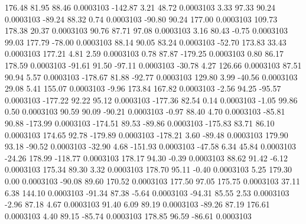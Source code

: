       176.48       81.95       88.46     0.0003103
     -142.87        3.21       48.72     0.0003103
        3.33       97.33       90.24     0.0003103
      -89.24       88.32        0.74     0.0003103
      -90.80       90.24      177.00     0.0003103
      109.73      178.38       20.37     0.0003103
       90.76       87.71       97.08     0.0003103
        3.16       80.43       -0.75     0.0003103
       99.03      177.79      -78.00     0.0003103
       88.14       90.05       83.24     0.0003103
      -52.70      173.83       33.43     0.0003103
      177.21        4.81        2.59     0.0003103
        0.78       87.87     -179.25     0.0003103
        0.80       86.17      178.59     0.0003103
      -91.61       91.50      -97.11     0.0003103
      -30.78        4.27      126.66     0.0003103
       87.51       90.94        5.57     0.0003103
     -178.67       81.88      -92.77     0.0003103
      129.80        3.99      -40.56     0.0003103
       29.08        5.41      155.07     0.0003103
       -9.96      173.84      167.82     0.0003103
       -2.56       94.25      -95.57     0.0003103
     -177.22       92.22       95.12     0.0003103
     -177.36       82.54        0.14     0.0003103
       -1.05       99.86        0.50     0.0003103
       90.59       90.09      -90.21     0.0003103
       -0.97       88.40        4.70     0.0003103
      -85.81       90.88     -173.99     0.0003103
     -174.51       89.53      -89.86     0.0003103
     -175.83       83.71       86.10     0.0003103
      174.65       92.78     -179.89     0.0003103
     -178.21        3.60      -89.48     0.0003103
      179.90       93.18      -90.52     0.0003103
      -32.90        4.68     -151.93     0.0003103
      -47.58        6.34       45.84     0.0003103
      -24.26      178.99     -118.77     0.0003103
      178.17       94.30       -0.39     0.0003103
       88.62       91.42       -6.12     0.0003103
      175.34       89.30        3.32     0.0003103
      178.70       95.11       -0.40     0.0003103
        5.25      179.30        0.00     0.0003103
      -90.08       89.60      170.52     0.0003103
      177.50       97.05      175.75     0.0003103
       37.11        6.38      144.10     0.0003103
      -91.34       87.38       -5.64     0.0003103
      -94.31       85.55        2.53     0.0003103
       -2.96       87.18        4.67     0.0003103
       91.40        6.09       89.19     0.0003103
      -89.26       87.19      176.61     0.0003103
        4.40       89.15      -85.74     0.0003103
      178.85       96.59      -86.61     0.0003103
